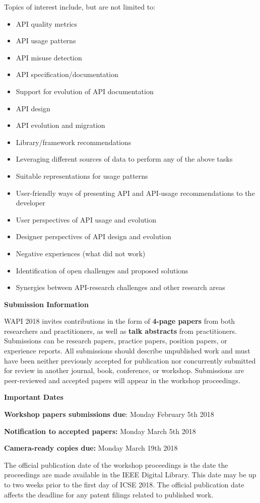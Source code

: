 \documentclass[10pt, conference]{IEEEtran}
\newcommand{\shortname}{WAPI}
\begin{document}
Topics of interest include, but are not limited to:
\begin{itemize}
\setlength\itemsep{5pt}

\item API quality metrics
\item API usage patterns
\item API misuse detection
\item API specification/documentation
\item Support for evolution of API documentation
\item API design
\item API evolution and migration
\item Library/framework recommendations
\item Leveraging different sources of data to perform any of the above tasks
\item Suitable representations for usage patterns
\item User-friendly ways of presenting API and API-usage recommendations to the developer
\item User perspectives of API usage and evolution
\item Designer perspectives of API design and evolution
\item Negative experiences (what did not work)
\item Identification of open challenges and proposed solutions
\item Synergies between API-research challenges and other research areas  
\end{itemize}


\vspace{0.2cm}
\noindent
\textbf{\large Submission Information}
\vspace{0.2cm}

\shortname{} 2018 invites contributions in the form of \textbf{4-page papers} from both researchers and practitioners, as well as \textbf{talk abstracts} from practitioners. Submissions can be research papers, practice papers, position papers, or experience reports. All submissions should describe unpublished work and must have been neither previously accepted for publication nor concurrently submitted for review in another journal, book, conference, or workshop. Submissions are peer-reviewed and accepted papers will appear in the workshop proceedings.

\vspace{0.2cm}
\noindent
\textbf{\large Important Dates}
\vspace{0.2cm}

\textbf{Workshop papers submissions due}: Monday February 5th 2018

\textbf{Notification to accepted papers:} Monday March 5th 2018

\textbf{Camera-ready copies due:} Monday March 19th 2018

\vspace{0.2cm}

The official publication date of the workshop proceedings is the date the proceedings are made available in the IEEE Digital Library. This date may be up to two weeks prior to the first day of ICSE 2018. The official publication date affects the deadline for any patent filings related to published work.
\end{document}
